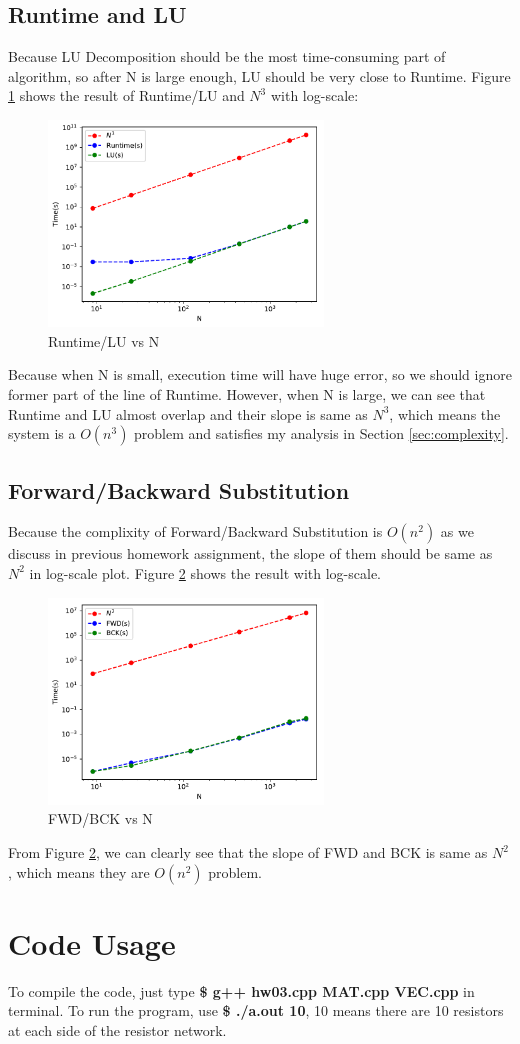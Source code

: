 \documentclass{article}
\begin{document}
\subsection{Runtime and LU}
Because LU Decomposition should be the most time-consuming part of algorithm, so after N is large enough, LU should be very close to
Runtime. Figure \ref{fig:runtime_lu} shows the result of Runtime/LU and $N^3$ with log-scale:
\begin{figure}[H]
    \centering
    \includegraphics[width=0.65\textwidth]{src/runtime_lu.pdf}
    \caption{Runtime/LU vs N}
    \label{fig:runtime_lu}
\end{figure}
Because when N is small, execution time will have huge error, so we should ignore former part of the line of Runtime. However, when
N is large, we can see that Runtime and LU almost overlap and their slope is same as $N^3$, which means the system is a 
{\boldmath$O(n^3)$} problem and satisfies my analysis in Section \ref{sec:complexity}.

\subsection{Forward/Backward Substitution}
Because the complixity of Forward/Backward Substitution is {\boldmath$O(n^2)$} as we discuss in previous homework assignment, the
slope of them should be same as $N^2$ in log-scale plot. Figure \ref{fig:fwd_bck} shows the result with log-scale.
\begin{figure}[H]
    \centering
    \includegraphics[width=0.65\textwidth]{src/fwd_bck.pdf}
    \caption{FWD/BCK vs N}
    \label{fig:fwd_bck}
\end{figure}
From Figure \ref{fig:fwd_bck}, we can clearly see that the slope of FWD and BCK is same as $N^2$, which means they are
{\boldmath$O(n^2)$} problem.

\section{Code Usage}
To compile the code, just type \textbf{\$ g++ hw03.cpp MAT.cpp VEC.cpp} in terminal. \newline
To run the program, use \textbf{\$ ./a.out 10}, 10 means there are 10 resistors at each side of the resistor network.
\end{document}
